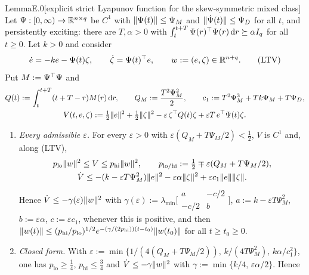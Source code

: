 \begin{thm}{Lemma}{E.0}[explicit strict Lyapunov function for the skew-symmetric mixed class]
Let $\Psi:[0,\infty)\to\mathbb{R}^{n\times q}$ be $C^1$ with $\lVert \Psi(t)\rVert\le\Psi_M$ and $\lVert \dot\Psi(t)\rVert\le\Psi_D$ for
all $t$, and persistently exciting: there are $T,\alpha>0$ with $\int_t^{t+T}\Psi(r)^\top\Psi(r)\,\mathrm{d} r\succeq\alpha I_q$
for all $t\ge0$. Let $k>0$ and consider
\begin{equation}\label{eq:thmE:LTV}
  \dot e=-ke-\Psi(t)\zeta,\qquad \dot\zeta=\Psi(t)^\top e,\qquad w:=(e,\zeta)\in\mathbb{R}^{n+q}.
  \tag{LTV}
\end{equation}
Put $M:=\Psi^\top\Psi$ and
\begin{gather*}
  Q(t):=\int_t^{t+T}(t+T-r)M(r)\,\mathrm{d} r,\qquad Q_M:=\frac{T^2\Psi_M^2}{2},\qquad
  c_1:=T^2\Psi_M^3+Tk\Psi_M+T\Psi_D,\\
  V(t,e,\zeta):=\tfrac12\lVert e\rVert^2+\tfrac12\lVert \zeta\rVert^2-\varepsilon\,\zeta^\top Q(t)\zeta+\varepsilon T\,e^\top\Psi(t)\zeta.
\end{gather*}
\begin{enumerate}[label=(\roman*)]
  \item \emph{Every admissible $\varepsilon$.} For every $\varepsilon>0$ with $\varepsilon(Q_M+T\Psi_M/2)<\frac12$,
    $V$ is $C^1$ and, along \textup{(LTV)},
    \begin{gather*}
      p_{\mathrm{lo}}\lVert w\rVert^2\le V\le p_{\mathrm{hi}}\lVert w\rVert^2,\qquad
      p_{\mathrm{lo}/\mathrm{hi}}:=\tfrac12\mp\varepsilon(Q_M+T\Psi_M/2),\\
      \dot V\le-(k-\varepsilon T\Psi_M^2)\lVert e\rVert^2-\varepsilon\alpha\lVert \zeta\rVert^2+\varepsilon c_1\lVert e\rVert\lVert \zeta\rVert.
    \end{gather*}
    Hence $\dot V\le-\gamma(\varepsilon)\lVert w\rVert^2$ with
    $\gamma(\varepsilon):=\lambda_{\min}\bigl[\begin{smallmatrix}a&-c/2\\-c/2&b\end{smallmatrix}\bigr]$,
    $a:=k-\varepsilon T\Psi_M^2$, $b:=\varepsilon\alpha$, $c:=\varepsilon c_1$, whenever this is positive, and then
    $\lVert w(t)\rVert\le(p_{\mathrm{hi}}/p_{\mathrm{lo}})^{1/2}e^{-(\gamma/(2p_{\mathrm{hi}}))(t-t_0)}\lVert w(t_0)\rVert$ for
    all $t\ge t_0\ge0$.
  \item \emph{Closed form.} With
    $\varepsilon:=\min\bigl\{1/(4(Q_M+T\Psi_M/2)),\,k/(4T\Psi_M^2),\,k\alpha/c_1^2\bigr\}$, one has
    $p_{\mathrm{lo}}\ge\frac14$, $p_{\mathrm{hi}}\le\frac34$ and $\dot V\le-\gamma\lVert w\rVert^2$ with
    $\gamma:=\min\{k/4,\,\varepsilon\alpha/2\}$. Hence

\end{enumerate}
\end{thm}
